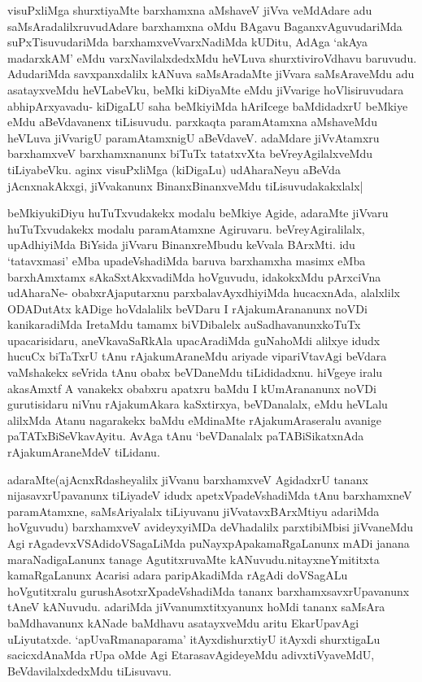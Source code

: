 \begin{artha}

visuPxliMga shurxtiyaMte barxhamxna aMshaveV jiVva veMdAdare adu
saMsAradalilxruvudAdare barxhamxna oMdu BAgavu BaganxvAguvudariMda
suPxTisuvudariMda barxhamxveVvarxNadiMda kUDitu, AdAga `akAya
madarxkAM' eMdu varxNavilalxdedxMdu heVLuva shurxtiviroVdhavu
baruvudu. AdudariMda savxpanxdalilx kANuva saMsAradaMte jiVvara
saMsAraveMdu adu asatayxveMdu heVLabeVku, beMki kiDiyaMte eMdu
jiVvarige hoVlisiruvudara abhipArxyavadu- kiDigaLU saha beMkiyiMda
hAriIcege baMdidadxrU beMkiye eMdu aBeVdavanenx tiLisuvudu. parxkaqta
paramAtamxna aMshaveMdu heVLuva jiVvarigU paramAtamxnigU
aBeVdaveV. adaMdare jiVvAtamxru barxhamxveV barxhamxnanunx biTuTx
tatatxvXta beVreyAgilalxveMdu tiLiyabeVku. aginx visuPxliMga
(kiDigaLu) udAharaNeyu aBeVda jAcnxnakAkxgi, jiVvakanunx
BinanxBinanxveMdu tiLisuvudakakxlalx|
\end{artha}

\begin{artha}
beMkiyukiDiyu huTuTxvudakekx modalu beMkiye Agide, adaraMte jiVvaru
huTuTxvudakekx modalu paramAtamxne Agiruvaru. beVreyAgiralilalx,
upAdhiyiMda BiYsida jiVvaru BinanxreMbudu keVvala BArxMti. idu
`tatavxmasi' eMba upadeVshadiMda baruva barxhamxha masimx eMba
barxhAmxtamx sAkaSxtAkxvadiMda hoVguvudu, idakokxMdu pArxciVna
udAharaNe- obabxrAjaputarxnu parxbalavAyxdhiyiMda hucacxnAda,
alalxlilx ODADutAtx kADige hoVdalalilx beVDaru I rAjakumArananunx
noVDi kanikaradiMda IretaMdu tamamx biVDibalelx auSadhavanunxkoTuTx
upacarisidaru, aneVkavaSaRkAla upacAradiMda guNahoMdi alilxye idudx
hucuCx biTaTxrU tAnu rAjakumAraneMdu ariyade vipariVtavAgi beVdara
vaMshakekx seVrida tAnu obabx beVDaneMdu tiLididadxnu. hiVgeye iralu
akasAmxtf A vanakekx obabxru apatxru baMdu I kUmArananunx noVDi
gurutisidaru niVnu rAjakumAkara  kaSxtirxya, beVDanalalx, eMdu
heVLalu alilxMda Atanu nagarakekx baMdu eMdinaMte rAjakumAraseralu
avanige paTATxBiSeVkavAyitu. AvAga tAnu `beVDanalalx paTABiSikatxnAda
rAjakumAraneMdeV tiLidanu.
\end{artha}

\begin{artha}
adaraMte(ajAcnxRdasheyalilx jiVvanu barxhamxveV AgidadxrU tananx
nijasavxrUpavanunx tiLiyadeV idudx apetxVpadeVshadiMda tAnu
barxhamxneV paramAtamxne, saMsAriyalalx tiLiyuvanu jiVvatavxBArxMtiyu
adariMda hoVguvudu) barxhamxveV avideyxyiMDa deVhadalilx parxtibiMbisi
jiVvaneMdu Agi rAgadevxVSAdidoVSagaLiMda puNayxpApakamaRgaLanunx mADi
janana maraNadigaLanunx tanage AgutitxruvaMte
kANuvudu.nitayxneYmititxta kamaRgaLanunx Acarisi adara paripAkadiMda
rAgAdi doVSagALu hoVgutitxralu gurushAsotxrXpadeVshadiMda tananx
barxhamxsavxrUpavanunx tAneV kANuvudu. adariMda jiVvanumxtitxyanunx
hoMdi tananx saMsAra baMdhavanunx kANade baMdhavu asatayxveMdu aritu
EkarUpavAgi uLiyutatxde. `apUvaRmanaparama' itAyxdishurxtiyU itAyxdi
shurxtigaLu sacicxdAnaMda rUpa oMde Agi EtarasavAgideyeMdu
adivxtiVyaveMdU, BeVdavilalxdedxMdu tiLisuvavu.
\end{artha}


\begin{shl}

\end{shl}
